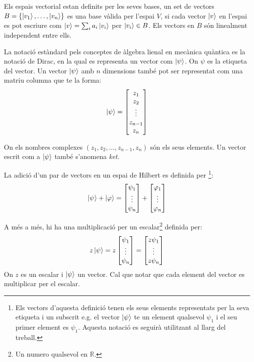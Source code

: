 Els espais vectorial estan definits per les seves bases, un set de vectors $B = \{\ket{v_1}, \dots, \ket{v_n}\}$ es una base vàlida per l'espai $V$, si cada vector $\ket{v}$ en l'espai es pot escriure com $\ket{v} = \sum_i a_i \ket{v_i}$ per $\ket{v_i} \in B$. Els vectors en $B$ són linealment independent entre ells.

La notació estàndard pels conceptes de  àlgebra lienal en mecànica quàntica es la notació de Dirac, en la qual es representa un vector com $ \ket{\psi} $. On $\psi$ es la etiqueta del vector. Un vector $ \ket{\psi} $ amb $n$ dimensions també pot ser representat com una matriu columna que te la forma: 
$$
\ket{\psi} = 
\begin{bmatrix}
	z_{1} \\
	z_{2} \\
	\vdots \\
	z_{n-1} \\
	z_{n}
\end{bmatrix}
$$

On els nombres complexes $(z_{1}, z_{2}, \dots , z_{n-1}, z_{n} )$ són els seus elements. Un vector escrit com a $\ket{\psi}$ també s'anomena \textit{ket}.

La adició d'un par de vectors en un espai de Hilbert es definida per \footnote{Els vectors d'aquesta definició tenen els seus elements representats per la seva etiqueta i un subscrit e.g. el vector $\ket{\psi}$ te un element qualsevol $\psi_{1}$ i el seu primer element es $\psi_{1}$. Aquesta notació es seguirà utilitzant al llarg del treball.}:
$$
\ket{\psi} + \ket{\varphi} = \begin{bmatrix} \psi_{1} \\ \vdots \\ \psi_{n} \end{bmatrix} +
\begin{bmatrix} \varphi_{1} \\ \vdots \\ \varphi_{n} \end{bmatrix}
$$

A més a més, hi ha una multiplicació per un escalar\footnote{Un numero qualsevol en $\mathbb{R}$.} definida per:
$$
  z\ket{\psi} = z\begin{bmatrix} \psi_{1} \\ \vdots \\ \psi_{n} \end{bmatrix} = \begin{bmatrix} z \psi_{1} \\ \vdots \\ z \psi_{n} \end{bmatrix}
$$
On $z$ es un escalar i $\ket{\psi}$ un vector. Cal que notar que cada element del vector es multiplicar per el escalar.

